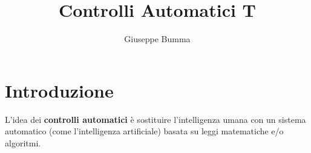 \documentclass{article}
\title{Controlli Automatici T}
\author{Giuseppe Bumma}
\begin{document}
\newcommand{\R}{\mathbb{R}}
\newcommand{\Varepsilon}{\mathcal{E}}
\newcommand{\rad}{\text{rad}}
\newcommand{\bb}[1]{\mathbb{#1}}
\newcommand{\cc}[1]{\mathcal{#1}}
\newcommand{ \lognormal }{\text{Lognormal} }
\newcommand{\T}[1]{\text{#1}}
\newcommand*\circled[1]{\tikz[baseline=(char.base)]{%
            \node[shape=circle,draw,inner sep=2pt] (char) {#1};}}


\tableofcontents

\maketitle

\section{Introduzione}
L'idea dei \textbf{controlli automatici} è sostituire l'intelligenza umana con un sistema automatico (come l'intelligenza artificiale) basata su leggi matematiche e/o algoritmi.
\end{document}

